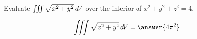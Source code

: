 \documentclass{ximera}
\author{David Guichard \and Neal Koblitz \and H. Jerome Keisler \and Albert Scheller \and Barry Balof \and Mike Wills \and Matthew Carr}
\begin{document}
\begin{exercise}




Evaluate $\iiint \sqrt{x^2+y^2} \mathop{}\!d\! V$ over the interior of $x^2+y^2+z^2=4$.

\begin{prompt}
\[
\iiint \sqrt{x^2+y^2} \d V=\answer{4\pi^2}
\]
\end{prompt}



\end{exercise}
\end{document}
